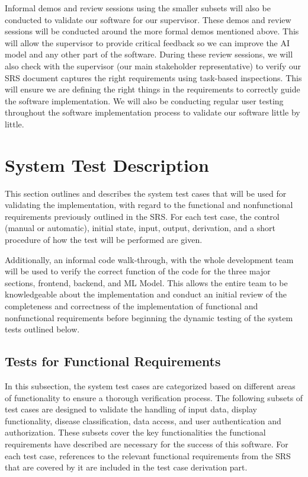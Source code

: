 \documentclass[12pt, titlepage]{article}
\begin{document}
Informal demos and review sessions using the smaller subsets will also be conducted to validate our software for our supervisor. These demos and review sessions will be conducted around the more formal demos mentioned above. This will allow the supervisor to provide critical feedback so we can improve the AI model and any other part of the software. During these review sessions, we will also check with the supervisor (our main stakeholder representative) to verify our SRS document captures the right requirements using task-based inspections. This will ensure we are defining the right things in the requirements to correctly guide the software implementation. We will also be conducting regular user testing throughout the software implementation process to validate our software little by little.


\section{System Test Description}
This section outlines and describes the system test cases that will be used for validating the implementation, with regard to the functional and nonfunctional requirements previously outlined in the SRS. For each test case, the control (manual or automatic), initial state, input, output, derivation, and a short procedure of how the test will be performed are given.

Additionally, an informal code walk-through, with the whole development team will be used to verify the correct function of the code for the three major sections, frontend, backend, and ML Model. This allows the entire team to be knowledgeable about the implementation and conduct an initial review of the completeness and correctness of the implementation of functional and nonfunctional requirements before beginning the dynamic testing of the system tests outlined below.

\subsection{Tests for Functional Requirements}
In this subsection, the system test cases are categorized based on different areas of functionality to ensure a thorough verification process. The following subsets of test cases are designed to validate the handling of input data, display functionality, disease classification, data access, and user authentication and authorization. These subsets cover the key functionalities the functional requirements have described are necessary for the success of this software. For each test case, references to the relevant functional requirements from the SRS that are covered by it are included in the test case derivation part.
\end{document}
